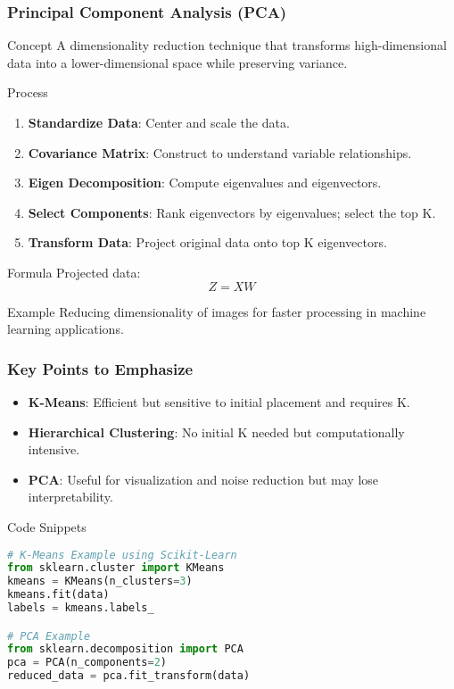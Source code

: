 \documentclass[aspectratio=169]{beamer}
\begin{document}
\begin{frame}[fragile]
    \frametitle{Principal Component Analysis (PCA)}
    \begin{block}{Concept}
        A dimensionality reduction technique that transforms high-dimensional data into a lower-dimensional space while preserving variance.
    \end{block}
    \begin{block}{Process}
        \begin{enumerate}
            \item \textbf{Standardize Data}: Center and scale the data.
            \item \textbf{Covariance Matrix}: Construct to understand variable relationships.
            \item \textbf{Eigen Decomposition}: Compute eigenvalues and eigenvectors.
            \item \textbf{Select Components}: Rank eigenvectors by eigenvalues; select the top K.
            \item \textbf{Transform Data}: Project original data onto top K eigenvectors.
        \end{enumerate}
    \end{block}
    \begin{block}{Formula}
        Projected data:
        \begin{equation}
        Z = X W 
        \end{equation}
    \end{block}
    \begin{block}{Example}
        Reducing dimensionality of images for faster processing in machine learning applications.
    \end{block}
\end{frame}

\begin{frame}[fragile]
    \frametitle{Key Points to Emphasize}
    \begin{itemize}
        \item \textbf{K-Means}: Efficient but sensitive to initial placement and requires K.
        \item \textbf{Hierarchical Clustering}: No initial K needed but computationally intensive.
        \item \textbf{PCA}: Useful for visualization and noise reduction but may lose interpretability.
    \end{itemize}
    \begin{block}{Code Snippets}
        \begin{lstlisting}[language=Python]
# K-Means Example using Scikit-Learn
from sklearn.cluster import KMeans
kmeans = KMeans(n_clusters=3)
kmeans.fit(data)
labels = kmeans.labels_

# PCA Example
from sklearn.decomposition import PCA
pca = PCA(n_components=2)
reduced_data = pca.fit_transform(data)
        \end{lstlisting}
    \end{block}
\end{frame}
\end{document}
